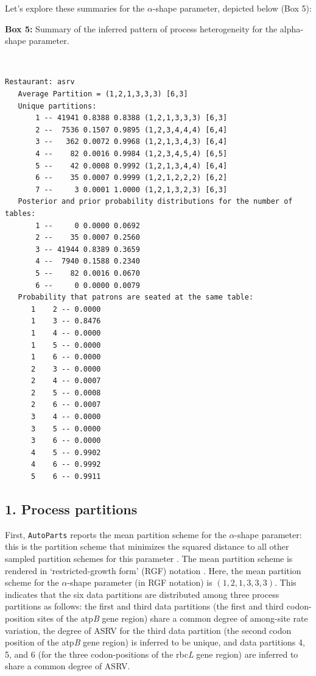 \documentclass[11pt]{article}
\begin{document}
Let's explore these summaries for the $\alpha$-shape parameter, depicted below (Box 5): 

\newpage
\begin{center}
{\bf Box 5:} Summary of the inferred pattern of process heterogeneity for the alpha-shape parameter. \\
\end{center}
{\tt \scriptsize 
\begin{framed}
\begin{lstlisting}[label=lst:box5]
Restaurant: asrv
   Average Partition = (1,2,1,3,3,3) [6,3]
   Unique partitions:
       1 -- 41941 0.8388 0.8388 (1,2,1,3,3,3) [6,3]
       2 --  7536 0.1507 0.9895 (1,2,3,4,4,4) [6,4]
       3 --   362 0.0072 0.9968 (1,2,1,3,4,3) [6,4]
       4 --    82 0.0016 0.9984 (1,2,3,4,5,4) [6,5]
       5 --    42 0.0008 0.9992 (1,2,1,3,4,4) [6,4]
       6 --    35 0.0007 0.9999 (1,2,1,2,2,2) [6,2]
       7 --     3 0.0001 1.0000 (1,2,1,3,2,3) [6,3]
   Posterior and prior probability distributions for the number of tables:
       1 --     0 0.0000 0.0692
       2 --    35 0.0007 0.2560
       3 -- 41944 0.8389 0.3659
       4 --  7940 0.1588 0.2340
       5 --    82 0.0016 0.0670
       6 --     0 0.0000 0.0079
   Probability that patrons are seated at the same table:
      1    2 -- 0.0000
      1    3 -- 0.8476
      1    4 -- 0.0000
      1    5 -- 0.0000
      1    6 -- 0.0000
      2    3 -- 0.0000
      2    4 -- 0.0007
      2    5 -- 0.0008
      2    6 -- 0.0007
      3    4 -- 0.0000
      3    5 -- 0.0000
      3    6 -- 0.0000
      4    5 -- 0.9902
      4    6 -- 0.9992
      5    6 -- 0.9911
\end{lstlisting}
\end{framed}}

\bigskip
\subsection*{1. Process partitions}
First, \verb!AutoParts! reports the mean partition scheme for the $\alpha$-shape parameter: this is the partition scheme that minimizes the squared distance to all other sampled partition schemes for this parameter \citep[][]{gusfield02}.
The mean partition scheme is rendered in `restricted-growth form' (RGF) notation \citep{stanton86}.
Here, the mean partition scheme for the $\alpha$-shape parameter (in RGF notation) is $(1,2,1,3,3,3)$.
This indicates that the six data partitions are distributed among three process partitions as follows: the first and third data partitions (the first and third codon-position sites of the atp\emph{B} gene region) share a common degree of among-site rate variation, the degree of ASRV for the third data partition (the second codon position of the atp\emph{B} gene region) is inferred to be unique, and data partitions 4, 5, and 6 (for the three codon-positions of the  rbc\emph{L} gene region) are inferred to share a common degree of ASRV. 
\end{document}
